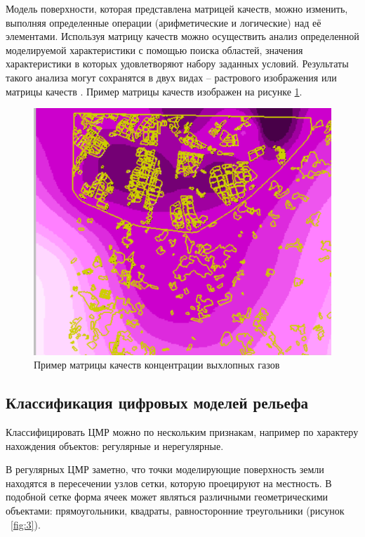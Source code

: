 Модель поверхности, которая представлена матрицей качеств, можно изменить, выполняя определенные операции (арифметические и логические) над её элементами. Используя матрицу качеств можно осуществить анализ определенной моделируемой характеристики с помощью поиска областей, значения характеристики в которых удовлетворяют набору заданных условий. Результаты такого анализа могут сохранятся в двух видах -- растрового изображения или матрицы качеств \cite{8,16}. Пример матрицы качеств изображен на рисунке \ref{fig:2}.

\begin{figure}[h!]
    \center
    \includegraphics[scale=0.7]{images/111.png}
    \caption{Пример матрицы качеств концентрации выхлопных газов}
    \label{fig:2}
\end{figure}

\subsection{Классификация цифровых моделей рельефа}
Классифицировать ЦМР можно по нескольким признакам, например по характеру нахождения объектов: регулярные и нерегулярные.

В регулярных ЦМР заметно, что точки моделирующие поверхность земли находятся в пересечении узлов сетки, которую проецируют на местность. В подобной сетке форма ячеек может являться различными геометрическими объектами: прямоугольники, квадраты, равносторонние треугольники (рисунок ~\ref{fig:3}).


